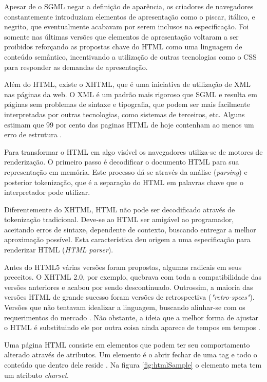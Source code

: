 \documentclass[
12pt,
a4paper,
portuges,
draft
]{report}
\begin{document}
Apesar de o SGML negar a definição de aparência, os criadores de
navegadores constantemente introduziam elementos de apresentação como o
piscar, itálico, e negrito, que eventualmente acabavam por serem inclusos
na especificação. Foi somente nas últimas versões que elementos de
apresentação voltaram a ser proibidos reforçando as propostas chave
do HTML como uma linguagem de conteúdo semântico, incentivando a
utilização de outras tecnologias como o CSS para responder as demandas de
apresentação.

Além do HTML, existe o XHTML, que é uma iniciativa de utilização
de XML nas páginas da web. O XML é um padrão mais rigoroso que SGML
e resulta em páginas sem problemas de sintaxe e tipografia,
que podem ser mais facilmente interpretadas por
outras tecnologias, como sistemas de terceiros, etc. Alguns estimam
que 99 por cento das paginas HTML de hoje contenham ao menos um erro de estrutura \autocite{diveIntohtml}.

Para transformar o HTML em algo visível os navegadores utiliza-se
de motores de renderização. O primeiro passo é decodificar o documento HTML
para sua representação em memória. Este processo dá-se através
da análise (\textit{parsing}) e posterior tokenização, que é a separação
do HTML em palavras chave que o interpretador pode utilizar.

Diferentemente do XHTML, HTML não pode ser decodificado através de
tokenização tradicional. Deve-se ao HTML ser amigável ao programador,
aceitando erros de sintaxe, dependente de contexto, buscando entregar a
melhor aproximação possível. Esta característica deu origem a uma
especificação para renderizar HTML (\textit{HTML parser}).

Antes do HTML5 várias versões foram propostas, algumas radicais
em seus preceitos. O XHTML 2.0, por exemplo, quebrava com toda
a compatibilidade das versões anteriores e acabou por sendo descontinuado.
Outrossim, a maioria das versões HTML de grande sucesso foram versões de
retrospectiva (\textit{"retro-specs"}). Versões que não tentavam
idealizar a linguagem, buscando alinhar-se com os requerimentos do
mercado \autocite{diveIntohtml}. Não obstante, a ideia que a melhor forma
de ajustar o HTML é substituindo ele por outra coisa ainda aparece de tempos
em tempos \autocite{diveIntohtml}.

Uma página HTML consiste em elementos que podem ter seu comportamento
alterado através de atributos. Um elemento é o abrir fechar de
uma tag e todo o conteúdo que dentro dele reside \autocite[pp.
10--11]{htmlAndCssDucket}. Na figura \ref{fig:htmlSample} o elemento
meta tem um atributo \textit{charset}.
\end{document}
